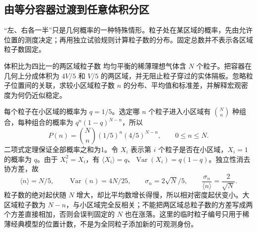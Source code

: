 \subsection{由等分容器过渡到任意体积分区}
“左、右各一半”只是几何概率的一种特殊情形。粒子处在某区域的概率，先由允许位置的测度决定；再用独立试验规则计算粒子数的分布。固定总数并不表示各区域粒子数固定。

\begin{origexamplebox}{体积比为四比一的两区域粒子数}\label{ch18:ex:teaching-asymmetric-binomial}
均匀平衡的稀薄理想气体含 $N$ 个粒子。把容器在几何上分成体积为 $4V/5$ 和 $V/5$ 的两区域，并无阻止粒子穿过的实体隔板。忽略粒子位置间的关联，求较小区域粒子数 $n$ 的分布、平均值和标准差，并解释宏观密度为何仍近似稳定。
\end{origexamplebox}
\begin{xesolution}
每个粒子在小区域的概率为 $q=1/5$。选定哪 $n$ 个粒子进入小区域有 $\binom Nn$ 种组合，每种组合的概率为 $q^n(1-q)^{N-n}$，所以
\[
 P(n)=\binom Nn(1/5)^n(4/5)^{N-n},\qquad 0\le n\le N.
\]
二项式定理保证全部概率之和为1。令 $X_i$ 表示第 $i$ 个粒子是否在小区域，$X_i=1$ 的概率为 $q$。由于 $X_i^2=X_i$，有 $\langle X_i\rangle=q$、$\operatorname{Var}(X_i)=q(1-q)$。独立性消去协方差，故
\[
 \langle n\rangle=N/5,\qquad \operatorname{Var}(n)=4N/25,
 \qquad \sigma_n=2\sqrt N/5,\qquad
 \frac{\sigma_n}{\langle n\rangle}=\frac2{\sqrt N}.
\]
粒子数的绝对起伏随 $N$ 增大，却比平均数增长得慢，所以相对密度起伏变小。大区域粒子数为 $N-n$，与小区域完全反相关；不能把两区域总粒子数的方差写成两个方差直接相加，否则会误判固定的 $N$ 也在涨落。这里的临时粒子编号只用于稀薄经典模型的位置计数，不是为全同粒子添加新的可观测身份。
\end{xesolution}
